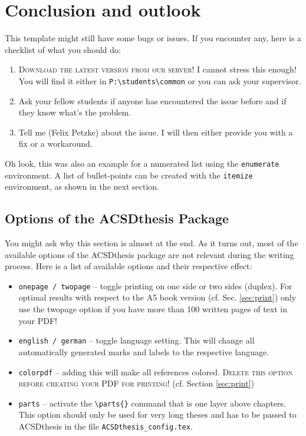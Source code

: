 \chapter{Conclusion and outlook}
\thispagestyle{empty}
This template might still have some bugs or issues. If you encounter any, here is a checklist of what you should do:
\begin{enumerate}
\item \textsc{Download the latest version from our server!} I cannot stress this enough! You will find it either in \texttt{P:\textbackslash students\textbackslash common} or you can ask your supervisor.
\item Ask your fellow students if anyone has encountered the issue before and if they know what's the problem. 
\item Tell me (Felix Petzke) about the issue. I will then either provide you with a fix or a workaround. 
\end{enumerate}

Oh look, this was also an example for a numerated list using the \texttt{enumerate} environment. A list of bullet-points can be created with the \texttt{itemize} environment, as shown in the next section.

\section{Options of the ACSDthesis Package}
\label{sec:options}
You might ask why this section is almost at the end. As it turns out, most of the available options of the ACSDthesis package are not relevant during the writing process. Here is a list of available options and their respective effect:
\begin{itemize}
\item \texttt{onepage / twopage} -- toggle printing on one side or two sides (duplex). For optimal results with respect to the A5 book version (cf. Sec. \ref{sec:print}) only use the twopage option if you have more than 100 written pages of text in your PDF!
\item \texttt{english / german} -- toggle language setting. This will change all automatically generated marks and labels to the respective language.
\item \texttt{colorpdf} -- adding this will make all references colored. \textsc{Delete this option before creating your PDF for printing!} (cf. Section \ref{sec:print})
\item \texttt{parts} -- activate the \texttt{\textbackslash parts\{\}} command that is one layer above chapters. This option should only be used for very long theses and has to be passed to ACSDthesis in the file  \texttt{ACSDthesis\_config.tex}.
\end{itemize}

